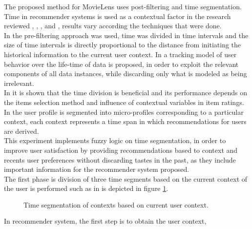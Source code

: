 The proposed method for MovieLens uses post-filtering 
and time segmentation.
Time in recommender systems is used  as a contextual factor in the
research reviewed \cite{baltrunas2009context},
\cite{baltrunas2009towards}, \cite{koren2010collaborative}, and
\cite{he2009time}, results vary according the techniques that were
done.\\  In \cite{he2009time} the pre-filtering approach was used, time
was divided in time intervals and the size of time intervals is
directly proportional to the distance from initiating the historical
information to the current user context. In
\cite{koren2010collaborative} a tracking model of user behavior over
the life-time of data is proposed, in order to exploit the relevant
components of all  data instances, while discarding only what is
modeled as being irrelevant.\\In \cite{baltrunas2009context} it is
shown that the time division is beneficial and its performance depends
on the items selection method and influence of contextual variables in
item ratings. In \cite{baltrunas2009towards} the user profile is
segmented into micro-profiles corresponding to a particular context,
each context represents a time span in which recommendations for users
are derived.\\This experiment implements fuzzy logic on time
segmentation, in order to improve user satisfaction by providing
recommendations based to context and recents user preferences without
discarding tastes in the past, as they include important information
for the recommender system proposed. \\The first phase is division of
three time segments based on the current context of the user is
performed such as in is depicted in figure \ref{fig:context-ml}.
\begin{figure}
\captionsetup{justification=centering,margin=2cm,font=footnotesize}
\centering
\setlength\fboxsep{0pt}
\caption{Time segmentation of contexts based on current user
context.}
\label{fig:context-ml}     
\end{figure}
In recommender system, the first step is to obtain the user context, 
